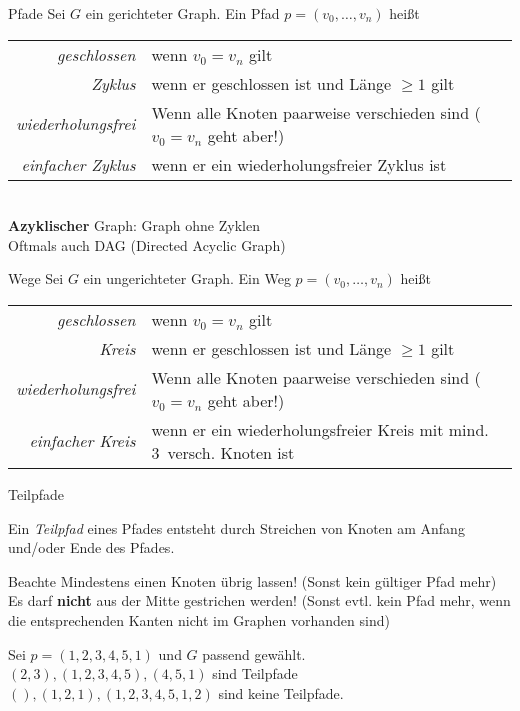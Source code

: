 \begin{frame}[t]{Pfade}
	Sei $G$ ein gerichteter Graph.{\hphantom{un}} Ein Pfad $p = (v_0, \dots, v_n)$ heißt
	\begin{tabular}{>{\itshape}rp{}}
		geschlossen & wenn $v_0 = v_n$ gilt  \\
		Zyklus & wenn er geschlossen ist und Länge $\geq 1$ gilt \\
		wiederholungsfrei & Wenn alle Knoten paarweise verschieden sind \newline ($v_0 = v_n$ geht aber!) \\
		einfacher Zyklus &  wenn er ein wiederholungsfreier Zyklus ist  \\
	\end{tabular}
	\medskip \\
	\textbf{Azyklischer} Graph: Graph ohne Zyklen\\
	\impl Oftmals auch DAG (Directed Acyclic Graph)
\end{frame}

\begin{frame}[t]{Wege}
	Sei $G$ ein \alert{un}gerichteter Graph. Ein \alert{Weg} $p = (v_0, \dots, v_n)$ heißt
	\begin{tabular}{>{\itshape}rp{}}
		geschlossen & wenn $v_0 = v_n$ gilt  \\
		\alert{Kreis} & wenn er geschlossen ist und Länge $\geq 1$ gilt \\
		wiederholungsfrei & Wenn alle Knoten paarweise verschieden sind \newline ($v_0 = v_n$ geht aber!) \\
		einfacher \alert{Kreis} &  wenn er ein wiederholungsfreier Kreis \alert{mit mind. 3~versch. Knoten} ist  \\
	\end{tabular}
\end{frame}

\begin{frame}{Teilpfade}
	\begin{Definition}
		Ein \emph{Teilpfad} eines Pfades entsteht durch Streichen von Knoten am Anfang und/oder Ende des Pfades.
	\end{Definition}

	\pause
	\begin{block}{Beachte}
		Mindestens einen Knoten übrig lassen! (Sonst kein gültiger Pfad mehr)\\
		Es darf \textbf{nicht} aus der Mitte gestrichen werden! (Sonst evtl. kein Pfad mehr, wenn die entsprechenden Kanten nicht im Graphen vorhanden sind)
	\end{block}

	\pause
	\begin{Beispiel}
		Sei $p = (1, 2, 3, 4, 5, 1)$ und $G$ passend gewählt.\\
		\pause
		$(2, 3), (1, 2, 3, 4, 5), (4, 5, 1)$ sind Teilpfade\\
		$(), (1, 2, 1), (1, 2, 3, 4, 5, 1, 2)$ sind keine Teilpfade.
	\end{Beispiel}
\end{frame}

